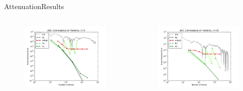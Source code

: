 \documentclass{beamer}
\begin{document}
\begin{frame}{Attenuation}{Results}%
  \begin{columns}
  \begin{column}{0.5\textwidth}
    \begin{figure}[h!]
      \centering
      \includegraphics[width=\textwidth]{../../graphics/attn_varconv_5}
    \end{figure}
  \end{column}
  \begin{column}{0.5\textwidth}
    \begin{figure}[h!]
      \centering
      \includegraphics[width=\textwidth]{../../graphics/attn_varconv_10}
    \end{figure}
  \end{column}
  \end{columns}
\end{frame}
\end{document}
